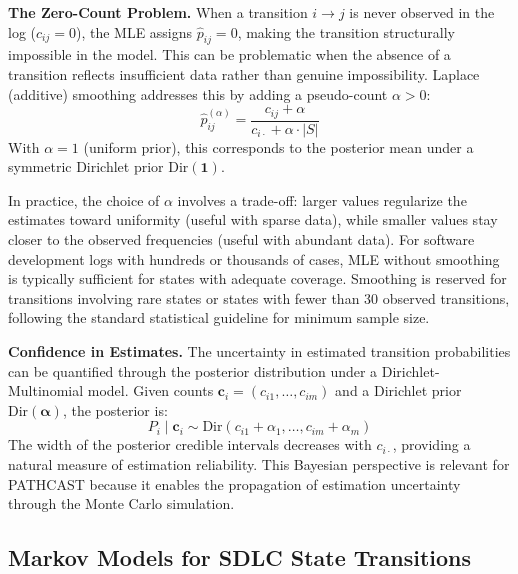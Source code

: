 \textbf{The Zero-Count Problem.} When a transition $i \rightarrow j$ is
never observed in the log ($c_{ij} = 0$), the MLE assigns
$\hat{p}_{ij} = 0$, making the transition structurally impossible in
the model. This can be problematic when the absence of a transition
reflects insufficient data rather than genuine impossibility. Laplace
(additive) smoothing addresses this by adding a pseudo-count $\alpha > 0$:
\begin{equation}
\label{eq:laplace-smoothing}
\hat{p}_{ij}^{(\alpha)} = \frac{c_{ij} + \alpha}
{c_{i\cdot} + \alpha \cdot |S|}
\end{equation}
With $\alpha = 1$ (uniform prior), this corresponds to the posterior mean
under a symmetric Dirichlet prior $\text{Dir}(\mathbf{1})$.

In practice, the choice of $\alpha$ involves a trade-off: larger values
regularize the estimates toward uniformity (useful with sparse data),
while smaller values stay closer to the observed frequencies (useful with
abundant data). For software development logs with hundreds or thousands
of cases, MLE without smoothing is typically sufficient for states with
adequate coverage. Smoothing is reserved for transitions involving rare
states or states with fewer than 30 observed transitions, following the
standard statistical guideline for minimum sample size.

\textbf{Confidence in Estimates.} The uncertainty in estimated transition
probabilities can be quantified through the posterior distribution under
a Dirichlet-Multinomial model. Given counts $\mathbf{c}_i = (c_{i1},
\ldots, c_{im})$ and a Dirichlet prior $\text{Dir}(\boldsymbol{\alpha})$,
the posterior is:
\begin{equation}
\label{eq:posterior-transition}
P_i \mid \mathbf{c}_i \sim
\text{Dir}(c_{i1} + \alpha_1, \ldots, c_{im} + \alpha_m)
\end{equation}
The width of the posterior credible intervals decreases with
$c_{i\cdot}$, providing a natural measure of estimation reliability.
This Bayesian perspective is relevant for PATHCAST because it
enables the propagation of estimation uncertainty through the Monte Carlo
simulation.


\subsection{Markov Models for SDLC State Transitions}
\label{sec:markov-sdlc}

